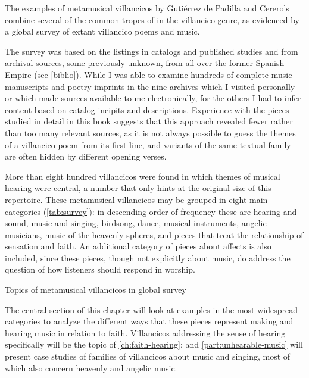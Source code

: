 The examples of metamusical villancicos by Gutiérrez de Padilla and Cererols
combine several of the common tropes of  in the
villancico genre, as evidenced by a global survey of extant villancico poems
and music.%
\begin{Footnote}
    The survey was based on the listings in catalogs and published studies and
    from archival sources, some previously unknown, from all over the former
    Spanish Empire (see \cref{biblio}).
    While I was able to examine hundreds of complete music manuscripts and
    poetry imprints in the nine archives which I visited personally or which
    made sources available to me electronically, for the others I had to infer
    content based on catalog incipits and descriptions.
    Experience with the pieces studied in detail in this book suggests that
    this approach revealed fewer rather than too many relevant sources, as it
    is not always possible to guess the themes of a villancico poem from its
    first line, and variants of the same textual family are often hidden by
    different opening verses.
\end{Footnote}
More than eight hundred villancicos were found in which themes of musical
hearing were central, a number that only hints at the original size of this
repertoire.
These metamusical villancicos may be grouped in eight main categories
(\cref{tab:survey}): in descending order of frequency these are hearing and
sound, music and singing, birdsong, dance, musical instruments, angelic
musicians, music of the heavenly spheres, and pieces that treat the
relationship of sensation and faith.
An additional category of pieces about affects is also included, since these
pieces, though not explicitly about music, do address the question of how
listeners should respond in worship. 

{Topics of metamusical villancicos in global survey}

The central section of this chapter will look at examples in the most
widespread categories to analyze the different ways that these pieces represent
making and hearing music in relation to faith.
Villancicos addressing the sense of hearing specifically will be the topic of
\cref{ch:faith-hearing}; and \cref{part:unhearable-music} will present case
studies of families of villancicos about music and singing, most of which also
concern heavenly and angelic music.

